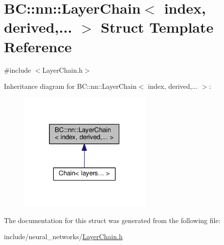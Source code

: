\hypertarget{structBC_1_1nn_1_1LayerChain}{}\section{BC\+:\+:nn\+:\+:Layer\+Chain$<$ index, derived,... $>$ Struct Template Reference}
\label{structBC_1_1nn_1_1LayerChain}


{\ttfamily \#include $<$Layer\+Chain.\+h$>$}



Inheritance diagram for BC\+:\+:nn\+:\+:Layer\+Chain$<$ index, derived,... $>$\+:
\nopagebreak
\begin{figure}[H]
\begin{center}
\leavevmode
\includegraphics[width=187pt]{structBC_1_1nn_1_1LayerChain__inherit__graph}
\end{center}
\end{figure}


The documentation for this struct was generated from the following file\+:\begin{DoxyCompactItemize}
\item 
include/neural\+\_\+networks/\hyperlink{LayerChain_8h}{Layer\+Chain.\+h}\end{DoxyCompactItemize}
